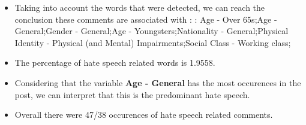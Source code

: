 \documentclass[11pt]{article}
\begin{document}
\begin{itemize}\item Taking into account the words that were detected, we can reach the conclusion these comments are associated with : : Age - Over 65s;Age - General;Gender - General;Age - Youngsters;Nationality - General;Physical Identity - Physical (and Mental) Impairments;Social Class - Working class;%

\item The percentage of hate speech related words is 1.9558.

\item Considering that the variable \textbf{Age - General} has the most occurences in the post, we can interpret that this is the predominant hate speech.

\item Overall there were 47/38 occurences of hate speech related comments.\end{itemize}
\end{document}
